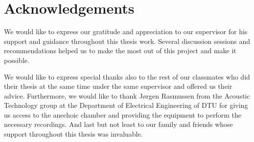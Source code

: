 \chapter*{Acknowledgements} 

We would like to express our gratitude and appreciation to our supervisor for his support and guidance throughout this thesis work.
Several discussion sessions and recommendations helped us to make the most out of this project and make it possible. 

We would like to express special thanks also to the rest of our classmates who did their thesis at the same time under the same supervisor and offered us their advice. Furthermore, we would like to thank Jørgen Rasmussen from the Acoustic Technology group at the Department of Electrical Engineering of DTU for giving us access to the anechoic chamber and providing the equipment to perform the necessary recordings. And last but not least to our family and friends whose support throughout this thesis was invaluable.  